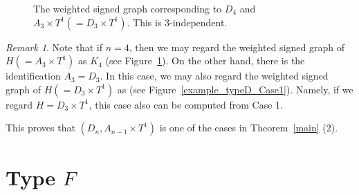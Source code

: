 \documentclass{amsart}
\theoremstyle{definition}
\theoremstyle{remark}
\newtheorem{remark}[theorem]{Remark}
\numberwithin{equation}{section}
\begin{document}
\begin{figure}[H]
\caption{The weighted signed graph corresponding to $D_{4}$ and $A_{3}\times T^{1}(=D_{3}\times T^{1})$. This is $3$-independent. }
\label{example_typeD_Case3}
\end{figure}

\begin{remark}
Note that if $n=4$, then we may regard 
the weighted signed graph of $H(=A_{3}\times T^1)$ as $K_{4}$ (see Figure~\ref{example_typeD_Case3}).
On the other hand, there is the identification $A_{3}=D_{3}$. 
In this case, we may also regard the weighted signed graph of $H(=D_{3}\times T^1)$ as (see Figure~\ref{example_typeD_Case1}).
Namely, 
if we regard $H=D_{3}\times T^1$, this case also can be computed from Case 1.
\end{remark}

This proves that $(D_{n},A_{n-1}\times T^{1})$ is one of the cases in Theorem~\ref{main} (2).

\section{Type $F$}
\label{sect:8}
\end{document}
